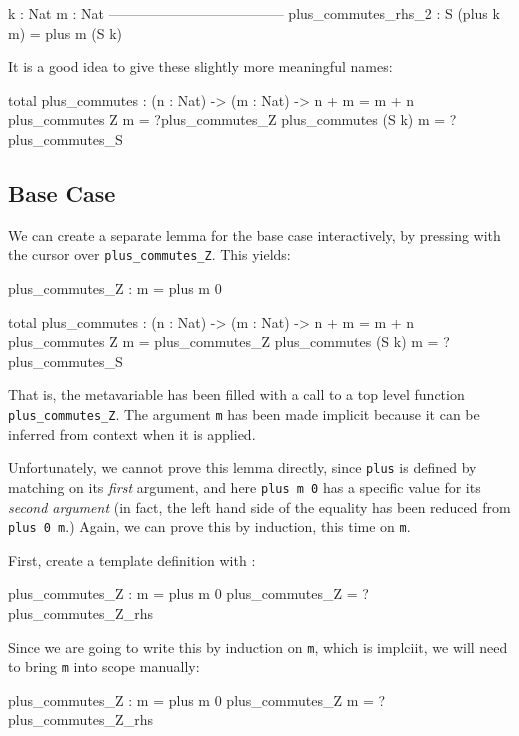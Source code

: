 \begin{code}
  k : Nat
  m : Nat
--------------------------------------
plus_commutes_rhs_2 : S (plus k m) = plus m (S k)
\end{code}

\noindent
It is a good idea to give these slightly more meaningful names:

\begin{code}
total
plus_commutes : (n : Nat) -> (m : Nat) -> n + m = m + n
plus_commutes Z m = ?plus_commutes_Z
plus_commutes (S k) m = ?plus_commutes_S
\end{code}

\subsection{Base Case}

We can create a separate lemma for the base case interactively, by pressing
\mklem{} with the cursor over \texttt{plus\_commutes\_Z}.
This yields:

\begin{code}
plus_commutes_Z : m = plus m 0

total
plus_commutes : (n : Nat) -> (m : Nat) -> n + m = m + n
plus_commutes Z m = plus_commutes_Z
plus_commutes (S k) m = ?plus_commutes_S
\end{code}

\noindent
That is, the metavariable has been filled with a call to a top level function
\texttt{plus\_commutes\_Z}. The argument \texttt{m} has been made implicit
because it can be inferred from context when it is applied.

Unfortunately, we cannot prove this lemma directly, since \texttt{plus} is
defined by matching on its \emph{first} argument, and here \texttt{plus m 0}
has a specific value for its \emph{second argument} (in fact, the left hand
side of the equality has been reduced from \texttt{plus 0 m}.) Again, we
can prove this by induction, this time on \texttt{m}. 

First, create a template definition with \mkdef{}:

\begin{code}
plus_commutes_Z : m = plus m 0
plus_commutes_Z = ?plus_commutes_Z_rhs
\end{code}

\noindent
Since we are going to write this by induction on \texttt{m}, which is
implciit, we will need to bring \texttt{m} into scope manually:

\begin{code}
plus_commutes_Z : m = plus m 0
plus_commutes_Z {m} = ?plus_commutes_Z_rhs
\end{code}

